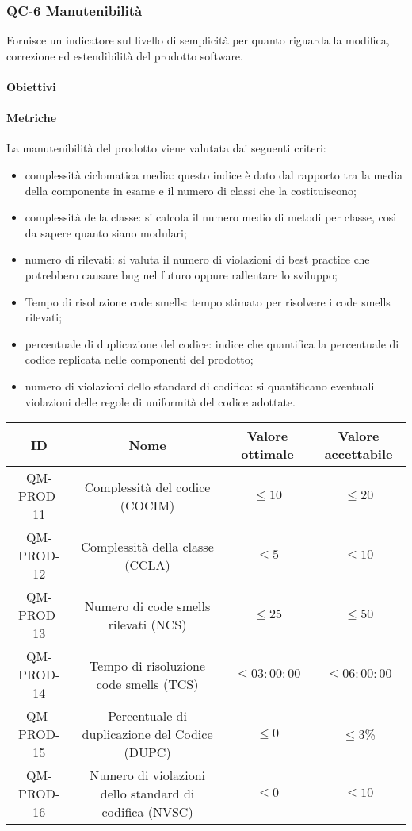\subsubsection{QC-6 Manutenibilità}
Fornisce un indicatore sul livello di semplicità per quanto riguarda la modifica, correzione ed estendibilità del prodotto software.
	\paragraph{Obiettivi}
		
	\paragraph{Metriche}
	La manutenibilità del prodotto viene valutata dai seguenti criteri:
	\begin{itemize}
		\item complessità ciclomatica media: questo indice è dato dal rapporto tra la  media della componente in esame e il numero di classi che la costituiscono;
		\item complessità della classe: si calcola il numero medio di metodi per classe, così da sapere quanto siano modulari;
		\item numero di  rilevati: si valuta il numero di violazioni di best practice che potrebbero causare bug nel futuro oppure rallentare lo sviluppo;
		\item Tempo di risoluzione code smells: tempo stimato per risolvere i code smells rilevati;
		\item percentuale di duplicazione del codice: indice che quantifica la percentuale di codice replicata nelle componenti del prodotto;
		\item numero di violazioni dello standard di codifica: si quantificano eventuali violazioni delle regole di uniformità del codice adottate.
	\end{itemize}
	\begin{center}
		\begin{tabular}{|c|c|c|c|}
			\rowcolor{lighter-grayer}
			\hline
			ID & Nome & Valore ottimale & Valore accettabile \\
			\hline
			QM-PROD-11 & Complessità del codice (COCIM) & \(\le 10\) & \(\le 20\) \\
			\hline
			QM-PROD-12 & Complessità della classe (CCLA) & \(\le 5\) & \(\le 10\) \\
			\hline
			QM-PROD-13 & Numero di code smells rilevati (NCS) & \(\le 25\) & \(\le 50\) \\
			\hline
			QM-PROD-14 & Tempo di risoluzione code smells (TCS) & \(\le 03:00:00\) & \(\le 06:00:00\) \\
			\hline
			QM-PROD-15 & Percentuale di duplicazione del Codice (DUPC) & \(\le 0\) & \(\le 3\)\% \\
			\hline
			QM-PROD-16 & Numero di violazioni dello standard di codifica (NVSC) & \(\le 0\) & \(\le 10\) \\
			\hline
		\end{tabular}
	\end{center}
